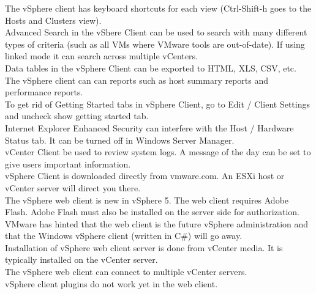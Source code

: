 The vSphere client has keyboard shortcuts for each view (Ctrl-Shift-h goes to
the Hosts and Clusters view).\\

Advanced Search in the vShere Client can be used to search with many different
types of criteria (such as all VMs where VMware tools are out-of-date). If
using linked mode it can search across multiple vCenters.\\

Data tables in the vSphere Client can be exported to HTML, XLS, CSV, etc.\\

The vSphere client can can reports such as host summary reports and performance
reports.\\

To get rid of Getting Started tabs in vSphere Client, go to
Edit / Client Settings and uncheck show getting started tab.\\

Internet Explorer Enhanced Security can interfere with the Host / Hardware
Status tab. It can be turned off in Windows Server Manager.\\

vCenter Client be used to review system logs. A message of the day can be set
to give users important information.\\

vSphere Client is downloaded directly from vmware.com. An ESXi host or vCenter
server will direct you there.\\

The vSphere web client is new in vSphere 5. The web client requires Adobe Flash.
Adobe Flash must also be installed on the server side for authorization.\\

VMware has hinted that the web client is the future vSphere administration
and that the Windows vSphere client (written in C\#) will go away.\\

Installation of vSphere web client server is done from vCenter media. It is
typically installed on the vCenter server.\\

The vSphere web client can connect to multiple vCenter servers.\\

vSphere client plugins do not work yet in the web client.
